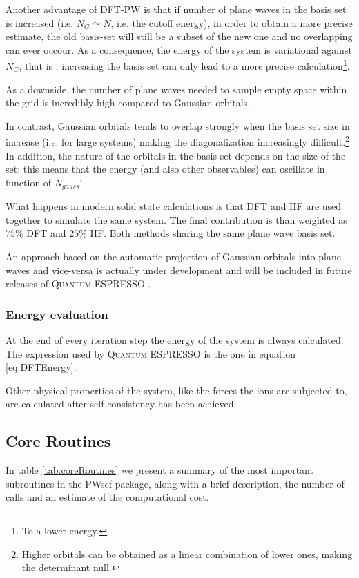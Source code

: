 \documentclass[a4paper,12pt]{article}
\newcommand\QE{\textsc{Quantum} ESPRESSO }
\begin{document}
Another advantage of DFT-PW is that if number of plane waves in the basis set is increased (i.e. $N_G \simeq N$, i.e. the cutoff energy), in order to obtain a more precise estimate, the old basis-set will still be a subset of the new one and no overlapping can ever occour. 
As a consequence, the energy of the system is variational against $N_G$, that is : increasing the basis set can only lead to a more precise calculation\footnote{To a lower energy.}.

As a downside, the number of plane waves needed to sample empty space within the grid is incredibly high compared to Gaussian orbitals.

In contrast, Gaussian orbitals tends to overlap strongly when the basis set size in increase (i.e. for large systems) making the diagonalization increasingly difficult.\footnote{Higher orbitals can be obtained as a linear combination of lower ones, making the determinant null.} 
In addition, the nature of the orbitals in the basis set depends on the size of the set; 
	this means that the energy (and also other observables) can oscillate in function of $N_{gauss}$!

What happens in modern solid state calculations is that DFT and HF are used together to simulate the same system. The final contribution is than weighted as $75\%$ DFT and $25\%$ HF. Both methods sharing the same plane wave basis set.

An approach based on the automatic projection of Gaussian orbitals into plane waves and vice-versa 
is actually under development and will be included in future releases of \QE.

\subsubsection{Energy evaluation}
At the end of every iteration step the energy of the system is always calculated. The expression used by \QE is the one in equation \eqref{eq:DFTEnergy}.

Other physical properties of the system, like the forces the ions are subjected to, are calculated after self-consistency has been achieved.

\subsection{Core Routines}\label{sec:CoreRoutines}

In table \ref{tab:coreRoutines} we present a summary of the most important subroutines in the PWscf package, along with a brief description, the number of calls and an estimate of the computational cost.
\end{document}
